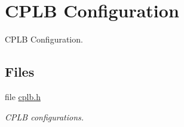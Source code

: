 \hypertarget{group__tll6527m__cplb}{}\section{C\+P\+LB Configuration}
\label{group__tll6527m__cplb}


C\+P\+LB Configuration.  


\subsection*{Files}
\begin{DoxyCompactItemize}
\item 
file \mbox{\hyperlink{TLL6527M_2include_2cplb_8h}{cplb.\+h}}
\begin{DoxyCompactList}\small\item\em C\+P\+LB configurations. \end{DoxyCompactList}\end{DoxyCompactItemize}
